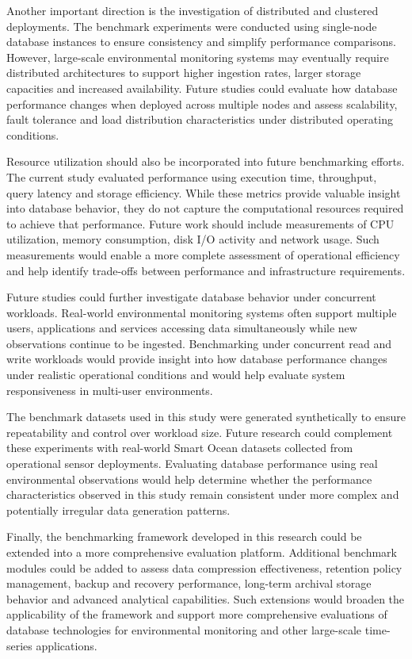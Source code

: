 Another important direction is the investigation of distributed and clustered deployments. The benchmark experiments were conducted using single-node database instances to ensure consistency and simplify performance comparisons. However, large-scale environmental monitoring systems may eventually require distributed architectures to support higher ingestion rates, larger storage capacities and increased availability. Future studies could evaluate how database performance changes when deployed across multiple nodes and assess scalability, fault tolerance and load distribution characteristics under distributed operating conditions.

Resource utilization should also be incorporated into future benchmarking efforts. The current study evaluated performance using execution time, throughput, query latency and storage efficiency. While these metrics provide valuable insight into database behavior, they do not capture the computational resources required to achieve that performance. Future work should include measurements of CPU utilization, memory consumption, disk I/O activity and network usage. Such measurements would enable a more complete assessment of operational efficiency and help identify trade-offs between performance and infrastructure requirements.


Future studies could further investigate database behavior under concurrent workloads. Real-world environmental monitoring systems often support multiple users, applications and services accessing data simultaneously while new observations continue to be ingested. Benchmarking under concurrent read and write workloads would provide insight into how database performance changes under realistic operational conditions and would help evaluate system responsiveness in multi-user environments.



The benchmark datasets used in this study were generated synthetically to ensure repeatability and control over workload size. Future research could complement these experiments with real-world Smart Ocean datasets collected from operational sensor deployments. Evaluating database performance using real environmental observations would help determine whether the performance characteristics observed in this study remain consistent under more complex and potentially irregular data generation patterns.


Finally, the benchmarking framework developed in this research could be extended into a more comprehensive evaluation platform. Additional benchmark modules could be added to assess data compression effectiveness, retention policy management, backup and recovery performance, long-term archival storage behavior and advanced analytical capabilities. Such extensions would broaden the applicability of the framework and support more comprehensive evaluations of database technologies for environmental monitoring and other large-scale time-series applications.



